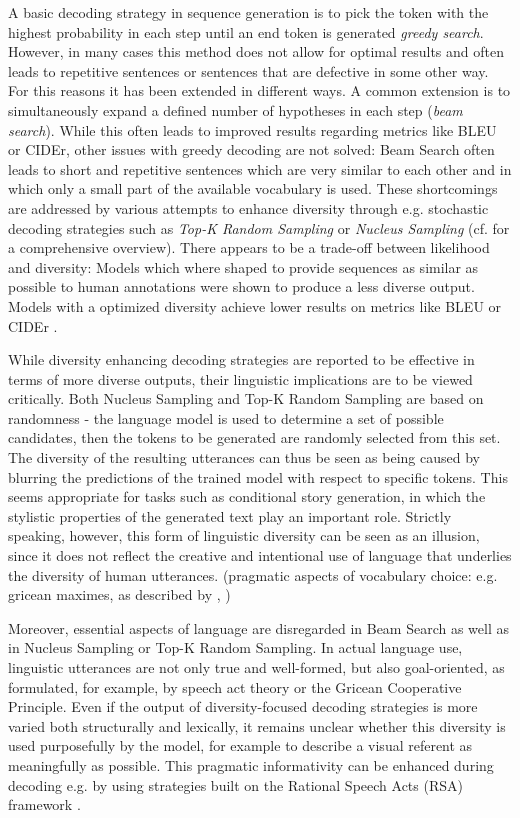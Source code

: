 \documentclass[11pt,a4paper]{article}
\begin{document}
A basic decoding strategy in sequence generation is to pick the token with the highest probability in each step until an end token is generated \textit{greedy search}. However, in many cases this method does not allow for optimal results and often leads to repetitive sentences or sentences that are defective in some other way. For this reasons it has been extended in different ways. 
A common extension is to simultaneously expand a defined number of hypotheses in each step (\textit{beam search}). While this often leads to improved results regarding metrics like BLEU or CIDEr, other issues with greedy decoding are not solved: Beam Search often leads to short and repetitive sentences which are very similar to each other and in which only a small part of the available vocabulary is used. 
These shortcomings are addressed by various attempts to enhance diversity through e.g. stochastic decoding strategies such as \textit{Top-K Random Sampling} \citep{fan-etal-2018-hierarchical} or \textit{Nucleus Sampling} \citep{Holtzman2019} (cf. \citet{Ippolito2019} for a comprehensive overview). There appears to be a trade-off between likelihood and diversity: Models which where shaped to provide sequences as similar as possible to human annotations were shown to produce a less diverse output. Models with a optimized diversity achieve lower results on metrics like BLEU or CIDEr \citep{Wang2019}.

While diversity enhancing decoding strategies are reported to be effective in terms of more diverse outputs, their linguistic implications are to be viewed critically. Both Nucleus Sampling and Top-K Random Sampling are based on randomness - the language model is used to determine a set of possible candidates, then the tokens to be generated are randomly selected from this set. The diversity of the resulting utterances can thus be seen as being caused by blurring the predictions of the trained model with respect to specific tokens. This seems appropriate for tasks such as conditional story generation, in which the stylistic properties of the generated text play an important role. 
Strictly speaking, however, this form of linguistic diversity can be seen as an illusion, since it does not reflect the creative and intentional use of language that underlies the diversity of human utterances. (pragmatic aspects of vocabulary choice: e.g. gricean maximes, as described by \citet{Cruse1977} \citep{reiter-1990-new}, \citep{Reiter1991})

Moreover, essential aspects of language are disregarded in Beam Search as well as in Nucleus Sampling or Top-K Random Sampling. In actual language use, linguistic utterances are not only true and well-formed, but also goal-oriented, as formulated, for example, by speech act theory or the Gricean Cooperative Principle. Even if the output of diversity-focused decoding strategies is more varied both structurally and lexically, it remains unclear whether this diversity is used purposefully by the model, for example to describe a visual referent as meaningfully as possible. This pragmatic informativity can be enhanced during decoding e.g. by using strategies built on the Rational Speech Acts (RSA) framework \citep{Cohn-Gordon2018}.
\end{document}
